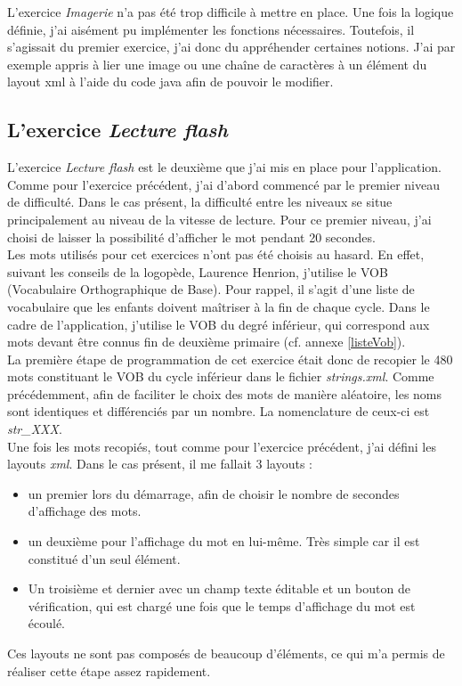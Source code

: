 L'exercice \textit{Imagerie} n'a pas été trop difficile à mettre en place. Une fois la logique définie, j'ai aisément pu implémenter les fonctions nécessaires. Toutefois, il s'agissait du premier exercice, j'ai donc du appréhender certaines notions. J'ai par exemple appris à lier une image ou une chaîne de caractères à un élément du layout xml à l'aide du code java afin de pouvoir le modifier.

\subsection{L'exercice \textit{Lecture flash}}
L'exercice \textit{Lecture flash} est le deuxième que j'ai mis en place pour l'application. Comme pour l'exercice précédent, j'ai d'abord commencé par le premier niveau de difficulté. Dans le cas présent, la difficulté entre les niveaux se situe principalement au niveau de la vitesse de lecture. Pour ce premier niveau, j'ai choisi de laisser la possibilité d'afficher le mot pendant 20 secondes.\\

Les mots utilisés pour cet exercices n'ont pas été choisis au hasard. En effet, suivant les conseils de la logopède, Laurence Henrion, j'utilise le VOB (Vocabulaire Orthographique de Base). Pour rappel, il s'agit d'une liste de vocabulaire que les enfants doivent maîtriser à la fin de chaque cycle. Dans le cadre de l'application, j'utilise le VOB du degré inférieur, qui correspond aux mots devant être connus fin de deuxième primaire (cf. annexe \ref{listeVob}).\\

La première étape de programmation de cet exercice était donc de recopier le 480 mots constituant le VOB du cycle inférieur dans le fichier \textit{strings.xml}. Comme précédemment, afin de faciliter le choix des mots de manière aléatoire, les noms sont identiques et différenciés par un nombre. La nomenclature de ceux-ci est \textit{str\_XXX}. \\

Une fois les mots recopiés, tout comme pour l'exercice précédent, j'ai défini les layouts \textit{xml}. Dans le cas présent, il me fallait 3 layouts :
\begin{itemize}
\item un premier lors du démarrage, afin de choisir le nombre de secondes d'affichage des mots.
\item un deuxième pour l'affichage du mot en lui-même. Très simple car il est constitué d'un seul élément.
\item Un troisième et dernier avec un champ texte éditable et un bouton de vérification, qui est chargé une fois que le temps d'affichage du mot est écoulé.
\end{itemize}
Ces layouts ne sont pas composés de beaucoup d'éléments, ce qui m'a permis de réaliser cette étape assez rapidement.\\

